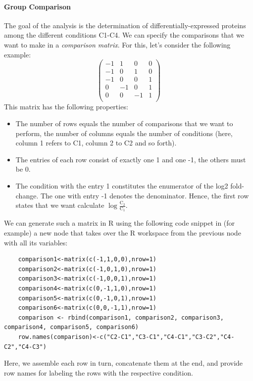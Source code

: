\paragraph{Group Comparison}\mbox{}\newline
\noindent The goal of the analysis is the determination of differentially-expressed
proteins among the different conditions C1-C4.
We can specify the comparisons that we want to make in a
\emph{comparison matrix}. For this, let's consider the following example:
\begin{equation}
	\begin{pmatrix}
	-1 & 1  & 0 & 0 \\
	-1 & 0  & 1 & 0 \\
	-1 & 0  & 0 & 1 \\
	 0 & -1 & 0 & 1 \\
	 0 & 0  & -1 & 1 \\
	\end{pmatrix}
\end{equation}
\noindent This matrix has the following properties:
\begin{itemize}
	\item
	The number of rows equals the number of comparisons that we want to
	perform, the number of columns equals the number of conditions
	(here, column 1 refers to C1, column 2 to C2 and so forth).
	\item 
	The entries of each row consist of exactly one 1 and one -1, the
	others must be 0.
	\item 
	The condition with the entry 1 constitutes the enumerator
	of the log2 fold-change. The one with entry -1 denotes the 
	denominator.
	Hence, the first row states that we want calculate
	$\log \frac{\text{C}_2}{\text{C}_1}$.
\end{itemize}

\noindent We can generate such a matrix in R using the following code snippet in (for example) a new  node
that takes over the R workspace from the previous node with all its variables:
\begin{lstlisting}
	comparison1<-matrix(c(-1,1,0,0),nrow=1)
	comparison2<-matrix(c(-1,0,1,0),nrow=1)
	comparison3<-matrix(c(-1,0,0,1),nrow=1)
	comparison4<-matrix(c(0,-1,1,0),nrow=1)
	comparison5<-matrix(c(0,-1,0,1),nrow=1)
	comparison6<-matrix(c(0,0,-1,1),nrow=1)
	comparison <- rbind(comparison1, comparison2, comparison3, comparison4, comparison5, comparison6)
	row.names(comparison)<-c("C2-C1","C3-C1","C4-C1","C3-C2","C4-C2","C4-C3")
\end{lstlisting}
Here, we assemble each row in turn, concatenate them at the end, and provide row names for labeling
the rows with the respective condition.

